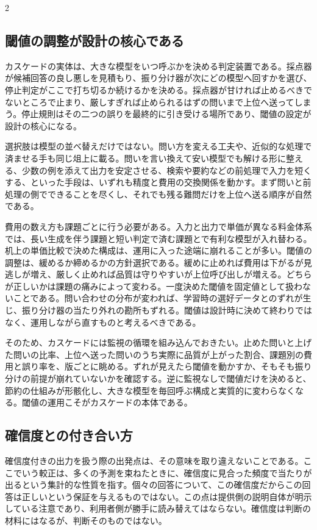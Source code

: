 \documentclass[lualatex,a4paper,10pt]{jlreq}
\begin{document}
\begin{multicols}{2}
\subsection{閾値の調整が設計の核心である}
カスケードの実体は、大きな模型をいつ呼ぶかを決める判定装置である。採点器が候補回答の良し悪しを見積もり、振り分け器が次にどの模型へ回すかを選び、停止判定がここで打ち切るか続けるかを決める\autocite{frugalgpt}。採点器が甘ければ止めるべきでないところで止まり、厳しすぎれば止められるはずの問いまで上位へ送ってしまう。停止規則はその二つの誤りを最終的に引き受ける場所であり、閾値の設定が設計の核心になる。

選択肢は模型の並べ替えだけではない。問い方を変える工夫や、近似的な処理で済ませる手も同じ俎上に載る。問いを言い換えて安い模型でも解ける形に整える、少数の例を添えて出力を安定させる、検索や要約などの前処理で入力を短くする、といった手段は、いずれも精度と費用の交換関係を動かす。まず問いと前処理の側でできることを尽くし、それでも残る難問だけを上位へ送る順序が自然である。

費用の数え方も課題ごとに行う必要がある。入力と出力で単価が異なる料金体系では、長い生成を伴う課題と短い判定で済む課題とで有利な模型が入れ替わる\autocite{frugalgpt}。机上の単価比較で決めた構成は、運用に入った途端に崩れることが多い。閾値の調整は、緩めるか締めるかの方針選択である。緩めに止めれば費用は下がるが見逃しが増え、厳しく止めれば品質は守りやすいが上位呼び出しが増える。どちらが正しいかは課題の痛みによって変わる。一度決めた閾値を固定値として扱わないことである。問い合わせの分布が変われば、学習時の選好データとのずれが生じ、振り分け器の当たり外れの勘所もずれる\autocite{routellm}\autocite{fragility}。閾値は設計時に決めて終わりではなく、運用しながら直すものと考えるべきである。

そのため、カスケードには監視の循環を組み込んでおきたい。止めた問いと上げた問いの比率、上位へ送った問いのうち実際に品質が上がった割合、課題別の費用と誤り率を、版ごとに眺める。ずれが見えたら閾値を動かすか、そもそも振り分けの前提が崩れていないかを確認する。逆に監視なしで閾値だけを決めると、節約の仕組みが形骸化し、大きな模型を毎回呼ぶ構成と実質的に変わらなくなる。閾値の運用こそがカスケードの本体である。

\subsection{確信度との付き合い方}
確信度付きの出力を扱う際の出発点は、その意味を取り違えないことである。ここでいう較正は、多くの予測を束ねたときに、確信度に見合った頻度で当たりが出るという集計的な性質を指す。個々の回答について、この確信度だからこの回答は正しいという保証を与えるものではない。この点は提供側の説明自体が明示している注意であり、利用者側が勝手に読み替えてはならない\autocite{sysoneconcepts}。確信度は判断の材料にはなるが、判断そのものではない。


\end{multicols}
\end{document}
